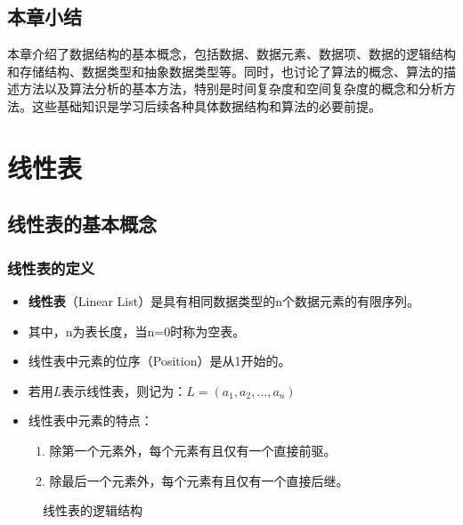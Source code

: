 \documentclass{../../note}
\begin{document}
\subsection{本章小结}
本章介绍了数据结构的基本概念，包括数据、数据元素、数据项、数据的逻辑结构和存储结构、数据类型和抽象数据类型等。同时，也讨论了算法的概念、算法的描述方法以及算法分析的基本方法，特别是时间复杂度和空间复杂度的概念和分析方法。这些基础知识是学习后续各种具体数据结构和算法的必要前提。

\section{线性表}

\subsection{线性表的基本概念}

\subsubsection{线性表的定义}
\begin{itemize}
  \item \textbf{线性表}（Linear List）是具有相同数据类型的n个数据元素的有限序列。
  \item 其中，n为表长度，当n=0时称为空表。
  \item 线性表中元素的位序（Position）是从1开始的。
  \item 若用$L$表示线性表，则记为：$L = (a_1, a_2, \ldots, a_n)$
  \item 线性表中元素的特点：
    \begin{enumerate}
      \item 除第一个元素外，每个元素有且仅有一个直接前驱。
      \item 除最后一个元素外，每个元素有且仅有一个直接后继。
    \end{enumerate}
\end{itemize}

\begin{figure}[h]
  \centering
  \caption{线性表的逻辑结构}
\end{figure}
\end{document}
